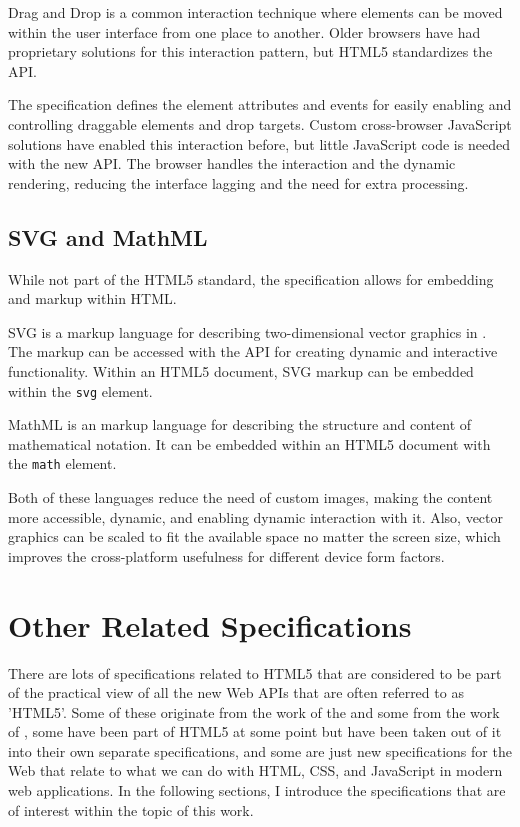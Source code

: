 Drag and Drop is a common interaction technique where elements can be
moved within the user interface from one place to another. Older
browsers have had proprietary solutions for this interaction pattern,
but HTML5 standardizes the API.

The specification defines the element attributes and  events
for easily enabling and controlling draggable elements and drop
targets. Custom cross-browser JavaScript solutions have enabled this
interaction before, but little JavaScript code is needed with the new
API. The browser handles the interaction and the dynamic rendering,
reducing the interface lagging and the need for extra processing.

\section{SVG and MathML}

While not part of the HTML5 standard, the specification allows for
embedding  \cite{SVGTiny12} and  \cite{MathML}
markup within HTML.

SVG is a markup language for describing two-dimensional vector
graphics in . The markup can be accessed with the 
API for creating dynamic and interactive functionality. Within an
HTML5 document, SVG markup can be embedded within the \texttt{svg}
element.

MathML is an  markup language for describing the structure
and content of mathematical notation. It can be embedded within an
HTML5 document with the \texttt{math} element.

Both of these languages reduce the need of custom images, making the
content more accessible, dynamic, and enabling dynamic interaction
with it. Also, vector graphics can be scaled to fit the available
space no matter the screen size, which improves the cross-platform
usefulness for different device form factors.

\chapter{Other Related Specifications}
\label{chapter:other-related-specifications}

There are lots of specifications related to HTML5 that are considered
to be part of the practical view of all the new Web APIs that are
often referred to as 'HTML5'. Some of these originate from the work of
the  and some from the work of , some have been
part of HTML5 at some point but have been taken out of it into their
own separate specifications, and some are just new specifications for
the Web that relate to what we can do with HTML, CSS, and JavaScript
in modern web applications. In the following sections, I introduce the
specifications that are of interest within the topic of this work.

